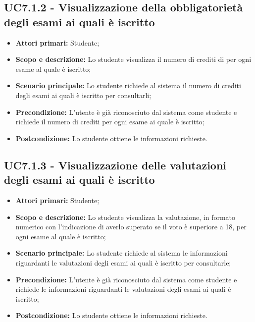 \documentclass[AnalisiDeiRequisiti.tex]{subfiles}
\begin{document}
\subsection{UC7.1.2 - Visualizzazione della obbligatorietà degli esami ai quali è iscritto}
\begin{itemize}
	\item \textbf{Attori primari:} Studente;\\
	\item \textbf{Scopo e descrizione:} Lo studente visualizza il numero di crediti di per ogni esame al quale è iscritto;\\
	\item \textbf{Scenario principale:} Lo studente richiede al sistema il numero di crediti degli esami ai quali è iscritto per consultarli;\\
	\item \textbf{Precondizione:} L'utente è già riconosciuto dal sistema come studente e richiede il numero di crediti per ogni esame ai quale è iscritto;\\
	\item \textbf{Postcondizione:} Lo studente ottiene le informazioni richieste.\\
\end{itemize}

\subsection{UC7.1.3 - Visualizzazione delle valutazioni degli esami ai quali è iscritto}
\begin{itemize}
	\item \textbf{Attori primari:} Studente;\\
	\item \textbf{Scopo e descrizione:} Lo studente visualizza la valutazione, in formato numerico con l'indicazione di averlo superato se il voto è superiore a 18, per ogni esame al quale è iscritto;\\
	\item \textbf{Scenario principale:} Lo studente richiede al sistema le informazioni riguardanti le valutazioni degli esami ai quali è iscritto per consultarle;\\
	\item \textbf{Precondizione:} L'utente è già riconosciuto dal sistema come studente e richiede le informazioni riguardanti le valutazioni degli esami ai quali è iscritto;\\
	\item \textbf{Postcondizione:} Lo studente ottiene le informazioni richieste.\\
\end{itemize}
\end{document}
